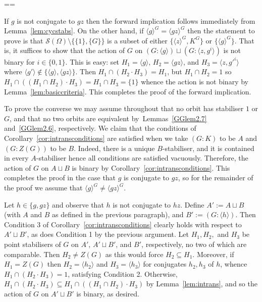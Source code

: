 \documentclass[11pt, a4paper]{amsart}
\makeatletter
\renewcommand{\proofname}{Proof}
\renewenvironment{proof}[1][\proofname]{\par
  \pushQED{\qed}  \normalfont \partopsep=\z@skip \topsep=\z@skip
  \trivlist
  \item[\hskip\labelsep
        \scshape
    #1\@addpunct{.}]\ignorespaces
}{  \popQED\endtrivlist\@endpefalse
}
\makeatother
\begin{document}
\begin{proof}
If $g$ is not conjugate to $gz$ then the forward implication follows immediately from Lemma~\ref{lem:cycstabs}. On the other hand, if $\langle g\rangle^G=\langle gz\rangle^G$ then the statement to prove is that $\mathcal{S}(\Omega)\setminus\{\{1\},\{G\}\}$ is a subset of either $\{\langle z\rangle ^G,K^G\}$ or $\{\langle g\rangle ^G\}$. That is, it suffices to show that the action of $G$ on $(G:\langle g\rangle)\sqcup(G:\langle z,g^i\rangle)$ is not binary for $i\in \{0,1\}$. This is easy: set $H_1=\langle g\rangle$, $H_2=\langle gz\rangle$, and $H_3=\langle z,g'^i\rangle$ where $\langle g'\rangle\not\in\{\langle g\rangle,\langle gz\rangle\}$. Then $H_1\cap(H_2\cdot H_3)=H_1$, but $H_1\cap H_2=1$ so $H_1\cap ((H_1\cap H_2)\cdot H_3)=H_1\cap H_3=\{1\}$ whence the action is not binary by Lemma~\ref{lem:basiccriteria}. This completes the proof of the forward implication.

To prove the converse we may assume throughout that no orbit has stabiliser $1$ or $G$, and that no two orbits are equivalent by~Lemmas~\ref{GGlem2.7} and~\ref{GGlem2.6}, respectively.     
We claim that the conditions of Corollary~\ref{cor:intransconditions} are satisfied when we take $(G:K)$ to be $A$ and $(G:Z(G))$ to be $B$. Indeed, there is a unique $B$-stabiliser, and it is contained in every $A$-stabiliser hence all conditions are satisfied vacuously.     Therefore, the action of $G$ on $A\sqcup B$ is binary by Corollary~\ref{cor:intransconditions}. This completes the proof in the case that $g$ is conjugate to $gz$, so for the remainder of the proof we assume that $\langle g\rangle^G\ne\langle gz\rangle^G$.
    
    Let $h\in \{g,gz\}$ and observe that $h$ is not conjugate to $hz$.  Define $A':=A\sqcup B$ (with $A$ and $B$ as defined in the previous paragraph), and $B':=(G:\langle h\rangle)$. Then Condition 3 of Corollary~\ref{cor:intransconditions} clearly holds with respect to $A'\sqcup B'$, as does Condition 1 by the previous argument. Let $H_1,H_2,$ and $H_3$ be point stabilisers of $G$ on $A'$, $A'\sqcup B'$, and $B'$, respectively, no two of which are comparable. Then $H_2\ne Z(G)$ as this would force $H_2\subseteq H_1$. Moreover, if $H_1=Z(G)$ then $H_2=\langle h_2\rangle$ and $H_3=\langle h_3\rangle$ for conjugates $h_2,h_3$ of $h$, whence $H_1\cap (H_2\cdot H_3)=1$, satisfying Condition 2. Otherwise, $H_1\cap (H_2\cdot H_3)\subseteq H_1\cap((H_1\cap H_2)\cdot H_3)$ by Lemma~\ref{lem:intrans}, and so the action of $G$ on $A'\sqcup B'$ is binary, as desired. 
               

\end{proof}
\end{document}
